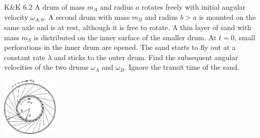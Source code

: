 \documentclass{esg8012pset}
\begin{document}
\begin{problem}{K\&K 6.2}
  A drum of mass $m_A$ and radius $a$ rotates freely with initial angular velocity $\omega_{A,0}$. A second drum with mass $m_B$ and radius $b > a$ is mounted on the same axle and is at rest, although it is free to rotate. A thin layer of sand with mass $m_S$ is distributed on the inner surface of the smaller drum. At $t = 0$, small perforations in the inner drum are opened. The sand starts to fly out at a constant rate $\lambda$ and sticks to the outer drum. Find the subsequent angular velocities of the two drums $\omega_A$ and $\omega_B$. Ignore the transit time of the sand.
  \begin{center}\includegraphics[width=0.2\textwidth]{ps08_1}\end{center}
\end{problem}
\end{document}

